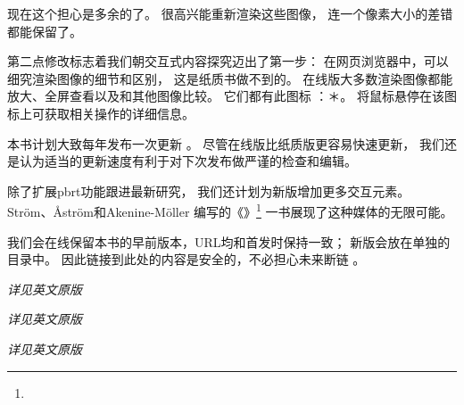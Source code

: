 现在这个担心是多余的了。
很高兴能重新渲染这些图像，
连一个像素大小的差错都能保留了。

第二点修改标志着我们朝交互式内容探究迈出了第一步：
在网页浏览器中，可以细究渲染图像的细节和区别，
这是纸质书做不到的。
在线版大多数渲染图像都能放大、全屏查看以及和其他图像比较。
它们都有此图标
：＊。
将鼠标悬停在该图标上可获取相关操作的详细信息。\\


本书计划大致每年发布一次更新
。
尽管在线版比纸质版更容易快速更新，
我们还是认为适当的更新速度有利于对下次发布做严谨的检查和编辑。

除了扩展pbrt功能跟进最新研究，
我们还计划为新版增加更多交互元素。
Str{\"o}m、{\AA}str{\"o}m和Akenine-M{\"o}ller
编写的《》\footnote{}
一书展现了这种媒体的无限可能。

我们会在线保留本书的早前版本，URL均和首发时保持一致；
新版会放在单独的目录中。
因此链接到此处的内容是安全的，不必担心未来断链
。\\


{\itshape 详见英文原版}\\


{\itshape 详见英文原版}\\


{\itshape 详见英文原版}